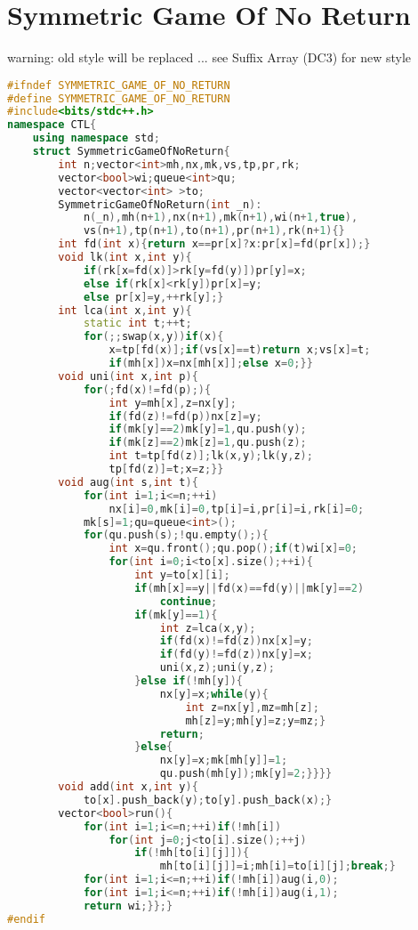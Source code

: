 \documentclass{book}
\begin{document}
\section{Symmetric Game Of No Return}
warning: old style will be replaced ... see Suffix Array (DC3) for new style\begin{lstlisting}[language=C++,title={Symmetric Game Of No Return.hpp (2665 bytes, 64 lines)}]
#ifndef SYMMETRIC_GAME_OF_NO_RETURN
#define SYMMETRIC_GAME_OF_NO_RETURN
#include<bits/stdc++.h>
namespace CTL{
    using namespace std;
    struct SymmetricGameOfNoReturn{
        int n;vector<int>mh,nx,mk,vs,tp,pr,rk;
        vector<bool>wi;queue<int>qu;
        vector<vector<int> >to;
        SymmetricGameOfNoReturn(int _n):
            n(_n),mh(n+1),nx(n+1),mk(n+1),wi(n+1,true),
            vs(n+1),tp(n+1),to(n+1),pr(n+1),rk(n+1){}
        int fd(int x){return x==pr[x]?x:pr[x]=fd(pr[x]);}
        void lk(int x,int y){
            if(rk[x=fd(x)]>rk[y=fd(y)])pr[y]=x;
            else if(rk[x]<rk[y])pr[x]=y;
            else pr[x]=y,++rk[y];}
        int lca(int x,int y){
            static int t;++t;
            for(;;swap(x,y))if(x){
                x=tp[fd(x)];if(vs[x]==t)return x;vs[x]=t;
                if(mh[x])x=nx[mh[x]];else x=0;}}
        void uni(int x,int p){
            for(;fd(x)!=fd(p);){
                int y=mh[x],z=nx[y];
                if(fd(z)!=fd(p))nx[z]=y;
                if(mk[y]==2)mk[y]=1,qu.push(y);
                if(mk[z]==2)mk[z]=1,qu.push(z);
                int t=tp[fd(z)];lk(x,y);lk(y,z);
                tp[fd(z)]=t;x=z;}}
        void aug(int s,int t){
            for(int i=1;i<=n;++i)
                nx[i]=0,mk[i]=0,tp[i]=i,pr[i]=i,rk[i]=0;
            mk[s]=1;qu=queue<int>();
            for(qu.push(s);!qu.empty();){
                int x=qu.front();qu.pop();if(t)wi[x]=0;
                for(int i=0;i<to[x].size();++i){
                    int y=to[x][i];
                    if(mh[x]==y||fd(x)==fd(y)||mk[y]==2)
                        continue;
                    if(mk[y]==1){
                        int z=lca(x,y);
                        if(fd(x)!=fd(z))nx[x]=y;
                        if(fd(y)!=fd(z))nx[y]=x;
                        uni(x,z);uni(y,z);
                    }else if(!mh[y]){
                        nx[y]=x;while(y){
                            int z=nx[y],mz=mh[z];
                            mh[z]=y;mh[y]=z;y=mz;}
                        return;
                    }else{
                        nx[y]=x;mk[mh[y]]=1;
                        qu.push(mh[y]);mk[y]=2;}}}}
        void add(int x,int y){
            to[x].push_back(y);to[y].push_back(x);}
        vector<bool>run(){
            for(int i=1;i<=n;++i)if(!mh[i])
                for(int j=0;j<to[i].size();++j)
                    if(!mh[to[i][j]]){
                        mh[to[i][j]]=i;mh[i]=to[i][j];break;}
            for(int i=1;i<=n;++i)if(!mh[i])aug(i,0);
            for(int i=1;i<=n;++i)if(!mh[i])aug(i,1);
            return wi;}};}
#endif\end{lstlisting}
\end{document}
